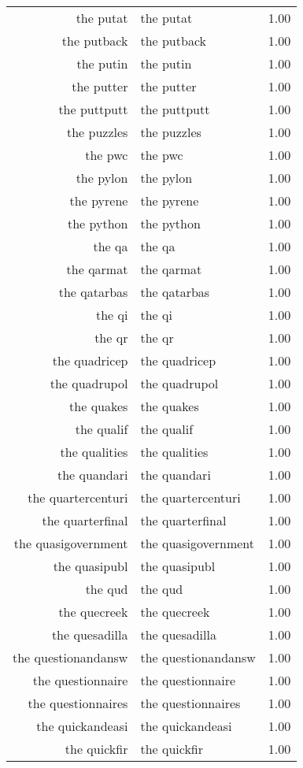 \begin{table}[ht]
\begin{tabular}{rlr}
  the putat & the putat & 1.00 \\ 
  the putback & the putback & 1.00 \\ 
  the putin & the putin & 1.00 \\ 
  the putter & the putter & 1.00 \\ 
  the puttputt & the puttputt & 1.00 \\ 
  the puzzles & the puzzles & 1.00 \\ 
  the pwc & the pwc & 1.00 \\ 
  the pylon & the pylon & 1.00 \\ 
  the pyrene & the pyrene & 1.00 \\ 
  the python & the python & 1.00 \\ 
  the qa & the qa & 1.00 \\ 
  the qarmat & the qarmat & 1.00 \\ 
  the qatarbas & the qatarbas & 1.00 \\ 
  the qi & the qi & 1.00 \\ 
  the qr & the qr & 1.00 \\ 
  the quadricep & the quadricep & 1.00 \\ 
  the quadrupol & the quadrupol & 1.00 \\ 
  the quakes & the quakes & 1.00 \\ 
  the qualif & the qualif & 1.00 \\ 
  the qualities & the qualities & 1.00 \\ 
  the quandari & the quandari & 1.00 \\ 
  the quartercenturi & the quartercenturi & 1.00 \\ 
  the quarterfinal & the quarterfinal & 1.00 \\ 
  the quasigovernment & the quasigovernment & 1.00 \\ 
  the quasipubl & the quasipubl & 1.00 \\ 
  the qud & the qud & 1.00 \\ 
  the quecreek & the quecreek & 1.00 \\ 
  the quesadilla & the quesadilla & 1.00 \\ 
  the questionandansw & the questionandansw & 1.00 \\ 
  the questionnaire & the questionnaire & 1.00 \\ 
  the questionnaires & the questionnaires & 1.00 \\ 
  the quickandeasi & the quickandeasi & 1.00 \\ 
  the quickfir & the quickfir & 1.00 \\ 

\end{tabular}
\end{table}
